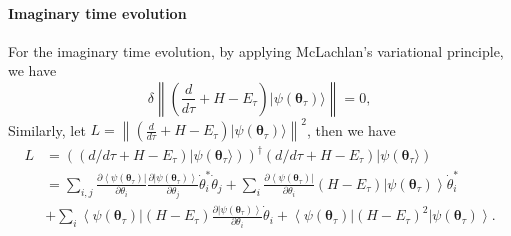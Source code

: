 \documentclass[twocolumn,
pra,aps,superscriptaddress,showpacs,amsmath,amssymb]{revtex4-2}
\begin{document}
\paragraph{\bf{Imaginary time evolution}}
For the imaginary time evolution, by applying McLachlan's variational principle, we have
\begin{equation}\label{eq:mprinciple_img}
\delta\left\|\left( \frac{d}{d\tau}+H - E_\tau \right)|\psi(\bm{\theta}_\tau)\rangle\right\| = 0,
\end{equation}
Similarly, let $L = \left\|\left( \frac{d}{d\tau}+H - E_\tau \right)|\psi(\bm{\theta}_\tau)\rangle\right\|^2$, then we have
\begin{align}
L &= \left(\left(d/d\tau+H - E_\tau\right)|\psi(\bm{\theta}_\tau\rangle)\right)^{\dagger}\left(d/d\tau+H - E_\tau\right)|\psi(\bm{\theta}_\tau\rangle)\\
&=\sum_{i,j}\frac{\partial\left<\psi(\bm{\theta}_\tau)\right|}{\partial\theta_i}\frac{\partial\left|\psi(\bm{\theta}_\tau)\right>}{\partial\theta_j}\dot{\theta}_i^*\dot{\theta}_j+\sum_i\frac{\partial\left<\psi(\bm{\theta}_\tau)\right|}{\partial\theta_i}(H - E_\tau)\left|\psi(\bm{\theta}_\tau)\right>\dot{\theta}_i^* \\
&+\sum_i\left<\psi(\bm{\theta}_\tau)\right|(H - E_\tau)\frac{\partial\left|\psi(\bm{\theta}_\tau)\right>}{\partial\theta_i}\dot{\theta}_i+\left<\psi(\bm{\theta}_\tau)\right|(H - E_\tau)^2\left|\psi(\bm{\theta}_\tau)\right>.
\end{align}
\end{document}
